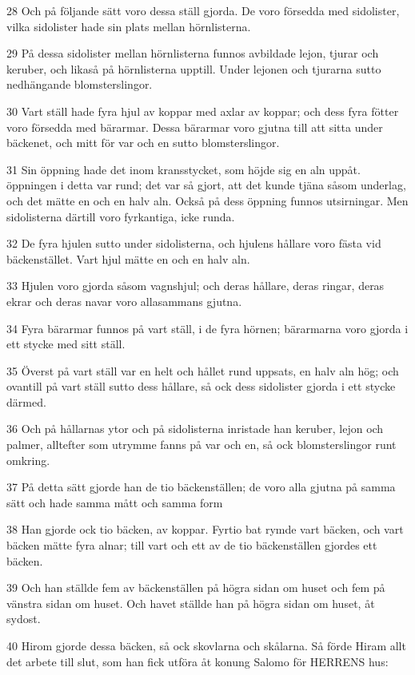 \par 28 Och på följande sätt voro dessa ställ gjorda. De voro försedda med sidolister, vilka sidolister hade sin plats mellan hörnlisterna.
\par 29 På dessa sidolister mellan hörnlisterna funnos avbildade lejon, tjurar och keruber, och likaså på hörnlisterna upptill. Under lejonen och tjurarna sutto nedhängande blomsterslingor.
\par 30 Vart ställ hade fyra hjul av koppar med axlar av koppar; och dess fyra fötter voro försedda med bärarmar. Dessa bärarmar voro gjutna till att sitta under bäckenet, och mitt för var och en sutto blomsterslingor.
\par 31 Sin öppning hade det inom kransstycket, som höjde sig en aln uppåt. öppningen i detta var rund; det var så gjort, att det kunde tjäna såsom underlag, och det mätte en och en halv aln. Också på dess öppning funnos utsirningar. Men sidolisterna därtill voro fyrkantiga, icke runda.
\par 32 De fyra hjulen sutto under sidolisterna, och hjulens hållare voro fästa vid bäckenstället. Vart hjul mätte en och en halv aln.
\par 33 Hjulen voro gjorda såsom vagnshjul; och deras hållare, deras ringar, deras ekrar och deras navar voro allasammans gjutna.
\par 34 Fyra bärarmar funnos på vart ställ, i de fyra hörnen; bärarmarna voro gjorda i ett stycke med sitt ställ.
\par 35 Överst på vart ställ var en helt och hållet rund uppsats, en halv aln hög; och ovantill på vart ställ sutto dess hållare, så ock dess sidolister gjorda i ett stycke därmed.
\par 36 Och på hållarnas ytor och på sidolisterna inristade han keruber, lejon och palmer, alltefter som utrymme fanns på var och en, så ock blomsterslingor runt omkring.
\par 37 På detta sätt gjorde han de tio bäckenställen; de voro alla gjutna på samma sätt och hade samma mått och samma form
\par 38 Han gjorde ock tio bäcken, av koppar. Fyrtio bat rymde vart bäcken, och vart bäcken mätte fyra alnar; till vart och ett av de tio bäckenställen gjordes ett bäcken.
\par 39 Och han ställde fem av bäckenställen på högra sidan om huset och fem på vänstra sidan om huset. Och havet ställde han på högra sidan om huset, åt sydost.
\par 40 Hirom gjorde dessa bäcken, så ock skovlarna och skålarna. Så förde Hiram allt det arbete till slut, som han fick utföra åt konung Salomo för HERRENS hus:
